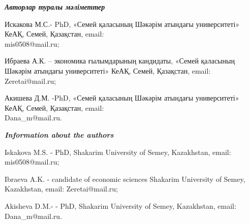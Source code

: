 \begin{authorinfo}
\hspace{1em}\emph{{\bfseries Авторлар туралы мәліметтер}}

Искакова М.С.- PhD, «Семей қаласының Шәкәрім атындағы университеті»
КеАҚ, Семей, Қазақстан, email: \\mis0508@mail.ru;

Ибраева А.К. -- экономика ғылымдарының кандидаты, «Семей қаласының
Шәкәрім атындағы университеті» КеАҚ, Семей, Қазақстан, email: Zeretai@mail.ru;

Акишева Д.М. -PhD, «Семей қаласының Шәкәрім атындағы университеті» КеАҚ,
Семей, Қазақстан, email: \\Dana\_m@mail.ru.

\hspace{1em}\emph{{\bfseries Information about the authors}}

Iskakova M.S. - PhD, Shakarim University of Semey, Kazakhstan, email:
mis0508@mail.ru;

Ibraeva A.K. - candidate of economic sciences Shakarim University of
Semey, Kazakhstan, email: Zeretai@mail.ru;

Akisheva D.M.- - PhD, Shakarim University of Semey, Kazakhstan, email:
Dana\_m@mail.ru.
\end{authorinfo}
